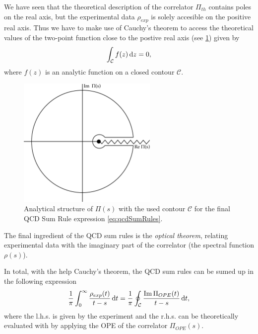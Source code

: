 \documentclass[../../index.tex]{subfiles}
\begin{document}
We have seen that the theoretical description of the correlator $\Pi_{th}$
contains poles on the real axis, but the experimental data $\rho_{exp}$ is solely
accesible on the positive real axis. Thus we have to make
use of Cauchy's theorem to access the theoretical values of the two-point function close to the
postive real axis (see \cref{fig:correlatorComplexContour}) given by
\begin{equation}
  \label{eq:cauchysTheorem}
  \int_{\mathcal{C}} f(z) \dif z = 0,
\end{equation}
where $f(z)$ is an analytic function on a closed contour $\mathcal{C}$.
\begin{figure}[h]
  \centering
  \label{fig:correlatorComplexContour}
  \includegraphics[width=0.6\textwidth]{./images/correlatorComplexContour.eps}
  \caption{Analytical structure of $\Pi(s)$ with the used contour $\mathcal{C}$
    for the final QCD Sum Rule expression \cref{eq:qcdSumRules}.}
\end{figure}

The final ingredient of the QCD sum rules is the \textit{optical theorem},
relating experimental data with the imaginary part of the correlator (the
spectral function $\rho(s)$). 

In total, with the help Cauchy's theorem, the QCD sum rules can be sumed up in
the following expression
\begin{equation}
  \label{eq:qcdSumRules}
  \frac{1}{\pi}\int_0^\infty \frac{\rho_{exp}(t)}{t - s}\dif t = \frac{1}{\pi} \oint_{\mathcal{C}} \frac{\Ima \Pi_{OPE}(t)}{t -s}\dif t,
\end{equation}
where the l.h.s. is given by the experiment and the r.h.s. can be theoretically
evaluated with by applying the OPE of the correlator $\Pi_{OPE}(s)$.
\end{document}
